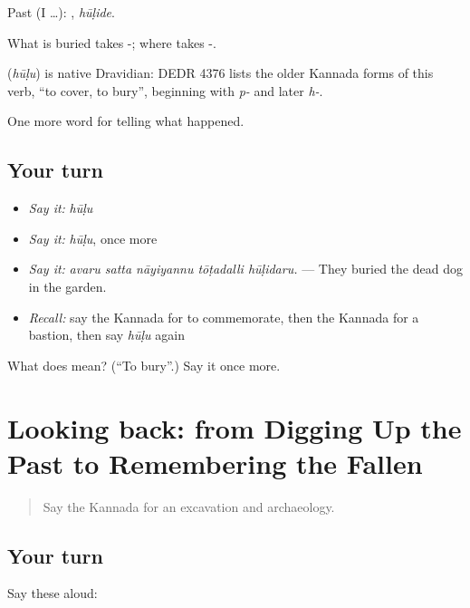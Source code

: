 Past (I …): , \emph{hūḷide}.

What is buried takes -; where takes -.

\begin{cousinweb}
\textbf{} (\emph{hūḷu}) is native Dravidian: DEDR 4376 lists the older Kannada forms of this verb, \textquotedblleft{}to cover, to bury\textquotedblright{}, beginning with \emph{p-} and later \emph{h-}.
\end{cousinweb}

\begin{grammarlens}[title={What you've built}]
One more word for telling what happened.
\end{grammarlens}

\subsection*{Your turn}
\begin{itemize}
\raggedright
  \item \emph{Say it:} \emph{hūḷu}
  \item \emph{Say it:} \emph{hūḷu}, once more
  \item \emph{Say it:} \emph{avaru satta nāyiyannu tōṭadalli hūḷidaru.} — They buried the dead dog in the garden.
  \item \emph{Recall:} say the Kannada for to commemorate, then the Kannada for a bastion, then say \emph{hūḷu} again
\end{itemize}

\begin{tcolorbox}[breakable,colback=teal!4,colframe=teal!35!black,title={Before you move on}]
What does  mean? (\textquotedblleft{}To bury\textquotedblright{}.) Say it once more.
\end{tcolorbox}
\section[(dialogue)]{Looking back: from Digging Up the Past to Remembering the Fallen}

\label{lesson:KA-R361-review-355-361}



\begin{quote}
Say the Kannada for an excavation and archaeology.
\end{quote}

\subsection*{Your turn}
Say these aloud:

